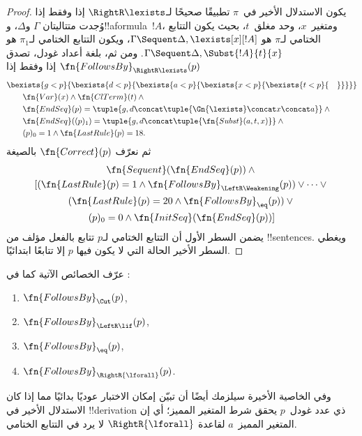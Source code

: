 \documentclass[../../../include/open-logic-section]{subfiles}
\begin{document}
\begin{proof}
يكون الاستدلال الأخير في~$\pi$ تطبيقًا صحيحًا لـ$\RightR\lexists$
إذا وفقط إذا وُجدت متتاليتان $\Gamma$ و$\Delta$، و!!a{formula}~$!A$،
ومتغير~$x$، وحد مغلق~$t$، بحيث يكون التتابع الختامي لـ$\pi$ هو
$\Gamma \Sequent \Delta,\lexists[x][!A]$، ويكون التتابع الختامي
لـ$\pi_1$ هو $\Gamma \Sequent \Delta,\Subst{!A}{t}{x}$. ومن ثم، بلغة
أعداد غودل، تصدق $\fn{FollowsBy}_{\RightR\lexists}(p)$ إذا وفقط إذا
\begin{align*}
  & \bexists{g<p}{\bexists{d<p}{\bexists{a<p}{\bexists{x<p}{\bexists{t<p}{\quad}}}}}\\
  & \qquad \fn{Var}(x) \land \fn{ClTerm}(t) \land {}\\
  & \qquad \fn{EndSeq}(p) = 
  \tuple{
    g,
    d \concat \tuple{\Gn{\lexists} \concat x \concat a}
  } \land {}\\
  & \qquad \fn{EndSeq}((p)_1) = 
  \tuple{
    g,
    d \concat \tuple{\fn{Subst}(a, t, x)}
  } \land {}\\
  & \qquad (p)_0 = 1 \land \fn{LastRule}(p) = 18.
\end{align*}
ثم نعرّف $\fn{Correct}(p)$ بالصيغة
\begin{multline*}
  \fn{Sequent}(\fn{EndSeq}(p)) \land {}\\ 
  [(\fn{LastRule}(p) = 1 \land 
  \fn{FollowsBy}_{\LeftR\Weakening}(p)) \lor \dots \lor {}\\
  (\fn{LastRule}(p) = 20 \land \fn{FollowsBy}_{\eq}(p)) \lor {}\\
  (p)_0 = 0 \land \fn{InitSeq}(\fn{EndSeq}(p))]
\end{multline*}
يضمن السطر الأول أن التتابع الختامي لـ$p$ تتابع بالفعل مؤلف من
!!{sentence}s. ويغطي السطر الأخير الحالة التي لا يكون فيها $p$ إلا
تتابعًا ابتدائيًا.
\end{proof}

\begin{prob}
  عرّف الخصائص الآتية كما في
  :
  \begin{enumerate}
  \item $\fn{FollowsBy}_{\Cut}(p)$,
  \item $\fn{FollowsBy}_{\LeftR\lif}(p)$,
  \item $\fn{FollowsBy}_{\eq}(p)$,
  \item $\fn{FollowsBy}_{\RightR{\lforall}}(p)$.
  \end{enumerate}
  وفي الخاصية الأخيرة سيلزمك أيضًا أن تبيّن إمكان الاختبار عوديًا
  بدائيًا مما إذا كان الاستدلال الأخير في !!{derivation} ذي عدد
  غودل~$p$ يحقق شرط المتغير المميز؛ أي إن المتغير المميز~$a$ لقاعدة
  $\RightR{\lforall}$ لا يرد في التتابع الختامي.
  \end{prob}
  
\end{document}
